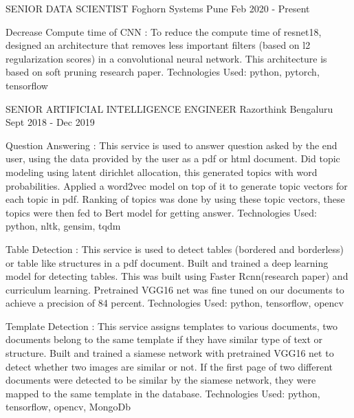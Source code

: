 
\begin{cventries}

  \cventry
    {SENIOR DATA SCIENTIST} %
    {Foghorn Systems} %
    {Pune} %
    {Feb 2020 - Present} %
    {
      \begin{cvitems} %
      \item{Decrease Compute time of CNN :  To reduce the compute time of resnet18, designed an architecture that removes less important filters (based on l2 regularization scores) in a convolutional neural network. This architecture is based on soft pruning research paper. Technologies Used: python, pytorch, tensorflow  }        
	\end{cvitems}
    }
  \cventry
    {SENIOR ARTIFICIAL INTELLIGENCE ENGINEER} %
    {Razorthink} %
    {Bengaluru} %
    {Sept 2018 - Dec 2019} %
    {
      \begin{cvitems} %
        \item{Question Answering : This service is used to answer question asked by the end user, using the data provided by the user as a pdf or html document. Did topic modeling using latent dirichlet allocation, this generated topics with word probabilities. Applied a word2vec model on top of it to generate topic vectors for each topic in pdf. Ranking of topics was done by using these topic vectors, these topics were then fed to Bert model for getting answer. Technologies Used: python, nltk, gensim, tqdm}        
        \item{Table Detection : This service is used to detect tables (bordered and borderless) or table like structures in a pdf document. Built and trained a deep learning model for detecting tables. This was built using Faster Rcnn(research paper) and curriculum learning. Pretrained VGG16 net was fine tuned on our documents to achieve a precision of 84 percent.  Technologies Used: python, tensorflow, opencv}        
        \item{Template Detection : This service assigns templates to various documents, two documents belong to the same template if they have similar type of text or structure. Built and trained a siamese network with pretrained VGG16 net to detect whether two images are similar or not. If the first page of two different documents were detected to be similar by the siamese network, they were mapped to the same template in the database. Technologies Used: python, tensorflow, opencv, MongoDb}        

\end{cvitems}}
\end{cventries}
